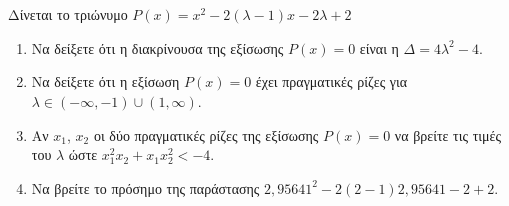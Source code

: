 \documentclass[12pt]{article}
\begin{document}
\part*{}

Δίνεται το τριώνυμο $P(x)=x^2-2(λ-1)x-2λ+2$\begin{enumerate}
  \item Να δείξετε ότι η διακρίνουσα της εξίσωσης $P(x)=0$ είναι η $Δ=4λ^2-4$.
  \item Να δείξετε ότι η εξίσωση $P(x)=0$ έχει πραγματικές ρίζες για $λ\in (-\infty,-1) \cup (1,\infty)$.
  \item Αν $x_1$, $x_2$ οι δύο πραγματικές ρίζες της εξίσωσης $P(x)=0$ να βρείτε τις τιμές του $λ$ ώστε $x_1^2x_2+x_1x_2^2<-4$.
  \item Να βρείτε το πρόσημο της παράστασης $2,95641^2-2(2-1)2,95641-2+2$.
\end{enumerate}

\part*{}
\end{document}
